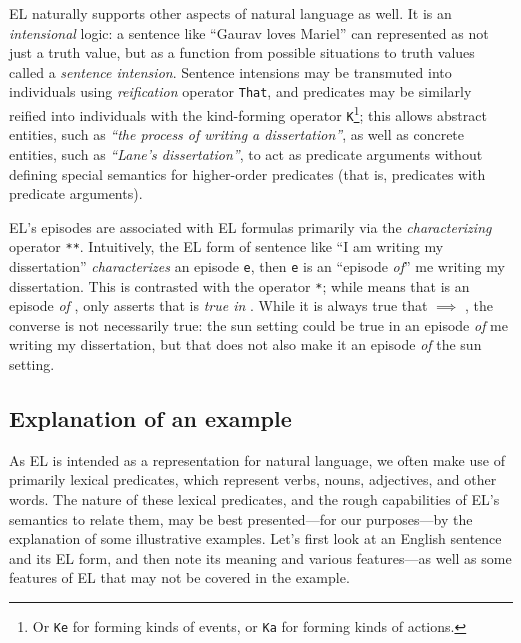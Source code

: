 EL naturally supports other aspects of natural language as well. It is an \textit{intensional} logic: a sentence like ``Gaurav loves Mariel'' can represented as not just a truth value, but as a function from possible situations to truth values called a \textit{sentence intension}. Sentence intensions may be transmuted into individuals using \textit{reification} operator \texttt{That}, and predicates may be similarly reified into individuals with the kind-forming operator \texttt{K}\footnote{Or \texttt{Ke} for forming kinds of events, or \texttt{Ka} for forming kinds of actions.}; this allows abstract entities, such as \textit{``the process of writing a dissertation''}, as well as concrete entities, such as \textit{``Lane's dissertation''}, to act as predicate arguments without defining special semantics for higher-order predicates (that is, predicates with predicate arguments).

EL's episodes are associated with EL formulas primarily via the \textit{characterizing} operator \texttt{**}. Intuitively, the EL form of sentence like ``I am writing my dissertation'' \textit{characterizes} an episode \texttt{e}, then \texttt{e} is an ``episode \textit{of}'' me writing my dissertation. This is contrasted with the operator \texttt{*}; while \el{[$\phi$ ** e]} means that  is an episode \textit{of} \el{$\phi$}, \el{[$\phi$ * e]} only asserts that \el{$\phi$} is \textit{true in} . While it is always true that \el{[$\phi$ ** e]} $\implies$ \el{[$\phi$ * e]}, the converse is not necessarily true: the sun setting could be true in an episode \textit{of} me writing my dissertation, but that does not also make it an episode \textit{of} the sun setting.



\subsection{Explanation of an example}
As EL is intended as a representation for natural language, we often make use of primarily lexical predicates, which represent verbs, nouns, adjectives, and other words. The nature of these lexical predicates, and the rough capabilities of EL's semantics to relate them, may be best presented---for our purposes---by the explanation of some illustrative examples. Let's first look at an English sentence and its EL form, and then note its meaning and various features---as well as some features of EL that may not be covered in the example.


